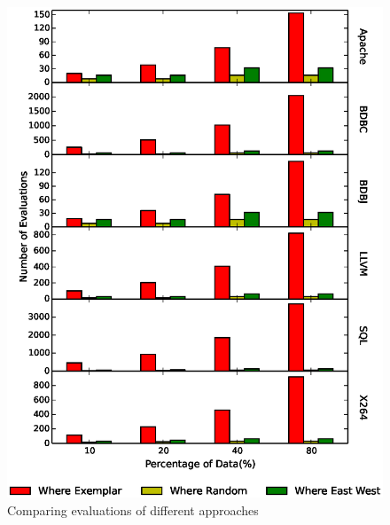 \documentclass{sig-alternative}
\begin{document}
    \begin{figure}[!t]
\includegraphics[width=0.9\linewidth]{Figures/evaluation_graph.eps}
\caption{ Comparing evaluations of different approaches }\label{fig:Evaluations}
\end{figure}
\end{document}
